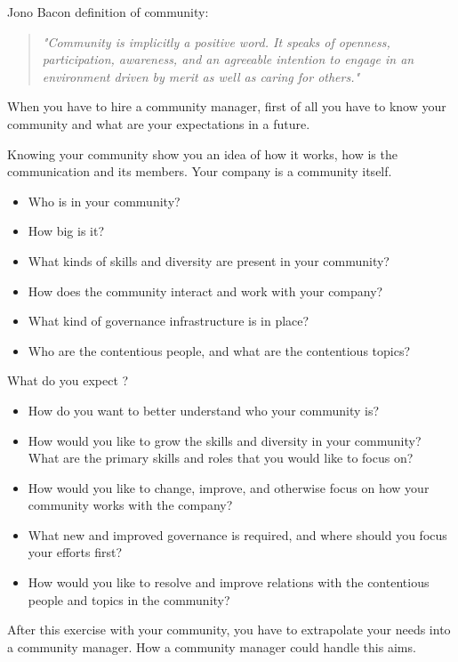 \documentclass[11pt]{scrartcl}
\begin{document}
\par Jono Bacon definition of community:
\begin{quote}
    \emph{"Community is implicitly a positive word. It speaks of openness, participation, awareness, and an agreeable intention to engage in an environment driven by merit as well as caring for others."}
\end{quote}

\par When you have to hire a community manager, first of all you have to know your community and what are your expectations in a future. 

\par Knowing your community show you an idea of how it works, how is the communication and its members. Your company is a community itself.

\begin{itemize}
	\item Who is in your community?
	\item How big is it?
	\item What kinds of skills and diversity are present in your community?
	\item How does the community interact and work with your company?
	\item What kind of governance infrastructure is in place?
	\item Who are the contentious people, and what are the contentious topics?
\end{itemize}

\par What do you expect ?
\begin{itemize}
	\item How do you want to better understand who your community is?
	\item How would you like to grow the skills and diversity in your community? What are the primary skills and roles that you would like to focus on?
	\item How would you like to change, improve, and otherwise focus on how your community works with the company?
	\item What new and improved governance is required, and where should you focus your efforts first?
	\item How would you like to resolve and improve relations with the contentious people and topics in the community?
\end{itemize}

\par After this exercise with your community, you have to extrapolate your needs into a community manager. How a community manager could handle this aims.
\end{document}
